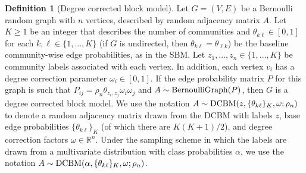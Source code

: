 \documentclass[
  12pt,
]{article}
\theoremstyle{definition}
\newtheorem{definition}{Definition}[section]
\theoremstyle{definition}
\theoremstyle{definition}
\theoremstyle{definition}
\theoremstyle{remark}
\begin{document}
\begin{definition}[Degree corrected block model]
\label{def:dcbm}
Let $G = (V, E)$ be a Bernoulli random graph with $n$ vertices, described by random adjacency matrix $A$. 
Let $K \geq 1$ be an integer that describes the number of communities and $\theta_{k \ell} \in [0, 1]$ for each $k, \ell \in \{1, ..., K\}$ (if $G$ is undirected, then $\theta_{k \ell} = \theta_{\ell k}$) be the baseline community-wise edge probabilities, as in the SBM. 
Let $z_1, ..., z_n \in \{1, ..., K\}$ be community labels associated with each vertex. 
In addition, each vertex $v_i$ has a degree correction parameter $\omega_i \in [0, 1]$. 
If the edge probability matrix $P$ for this graph is such that $P_{ij} = \rho_n \theta_{z_i, z_j} \omega_i \omega_j$ and $A \sim \mathrm{BernoulliGraph}(P)$, then $G$ is a degree corrected block model. 
We use the notation $A \sim \mathrm{DCBM}(z, \{\theta_{k \ell}\}_K, \omega; \rho_n)$ to denote a random adjacency matrix drawn from the DCBM with labels $z$, base edge probabilities $\{\theta_{k \ell}\}_K$ (of which there are $K (K+1) / 2$), and degree correction factors $\omega \in \mathbb{R}^n$. 
Under the sampling scheme in which the labels are drawn from a multivariate distribution with class probabilities $\alpha$, we use the notation $A \sim \mathrm{DCBM}(\alpha, \{\theta_{k \ell}\}_K, \omega; \rho_n)$.
\end{definition}
\end{document}
